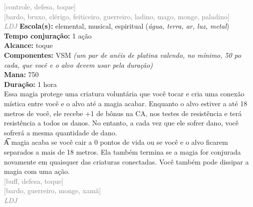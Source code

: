 \documentclass{RPG_Adventure}[2021/10/20]
\begin{document}
{\scriptsize \textcolor{gray}{[controle, defesa, toque]\\}}
{\scriptsize \textcolor{gray}{[bardo, bruxo, clérigo, feiticeiro, guerreiro, ladino, mago, monge, paladino]\\}}
{\tiny \textcolor{gray}{\textit{LDJ}}}\jump{}
{\small \t \textbf{Escola(s):} elemental, musical, espiritual (\textit{água, terra, ar, luz, metal})\\\t \textbf{Tempo conjuração:} 1 ação\\\t \textbf{Alcance:} toque\\\t \textbf{Componentes:} VSM \textit{(um par de anéis de platina valendo, no mínimo, 50 po cada, que você e o alvo devem usar pela duração)}\\\t \textbf{Mana:} 750\\\t \textbf{Duração:} 1 hora\\}
{\normalsize Essa magia protege uma criatura voluntária que você tocar e cria uma conexão mística entre você e o alvo até a magia acabar. Enquanto o alvo estiver a até 18 metros de você, ele recebe +1 de bônus na CA, nos testes de resistência e terá resistência a todos os danos. No entanto, a cada vez que ele sofrer dano, você sofrerá a mesma quantidade de dano.\\\t A magia acaba se você cair a 0 pontos de vida ou se você e o alvo ficarem separados a mais de 18 metros. Ela também termina se a magia for conjurada novamente em quaisquer das criaturas conectadas. Você também pode dissipar a magia com uma ação.\\}
{\scriptsize \textcolor{gray}{[buff, defesa, toque]\\}}
{\scriptsize \textcolor{gray}{[bardo, guerreiro, monge, xamã]\\}}
{\tiny \textcolor{gray}{\textit{LDJ}}}\jump

\end{document}
